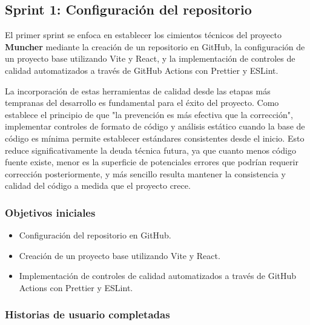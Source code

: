 \subsection*{Sprint 1: Configuración del repositorio}

El primer sprint se enfoca en establecer los cimientos técnicos del proyecto
\textbf{Muncher} mediante la creación de un repositorio en GitHub, la
configuración de un proyecto base utilizando Vite y React, y la implementación
de controles de calidad automatizados a través de GitHub Actions con Prettier y
ESLint.

La incorporación de estas herramientas de calidad desde las etapas más
tempranas del desarrollo es fundamental para el éxito del proyecto. Como
establece el principio de que "la prevención es más efectiva que la
corrección", implementar controles de formato de código y análisis estático
cuando la base de código es mínima permite establecer estándares consistentes
desde el inicio. Esto reduce significativamente la deuda técnica futura, ya que
cuanto menos código fuente existe, menor es la superficie de potenciales
errores que podrían requerir corrección posteriormente, y más sencillo resulta
mantener la consistencia y calidad del código a medida que el proyecto crece.

\subsubsection*{Objetivos iniciales}

\begin{itemize}
	\item Configuración del repositorio en GitHub.
	\item Creación de un proyecto base utilizando Vite y React.
	\item Implementación de controles de calidad automatizados a través de GitHub Actions
	      con Prettier y ESLint.
\end{itemize}

\subsubsection*{Historias de usuario completadas}

